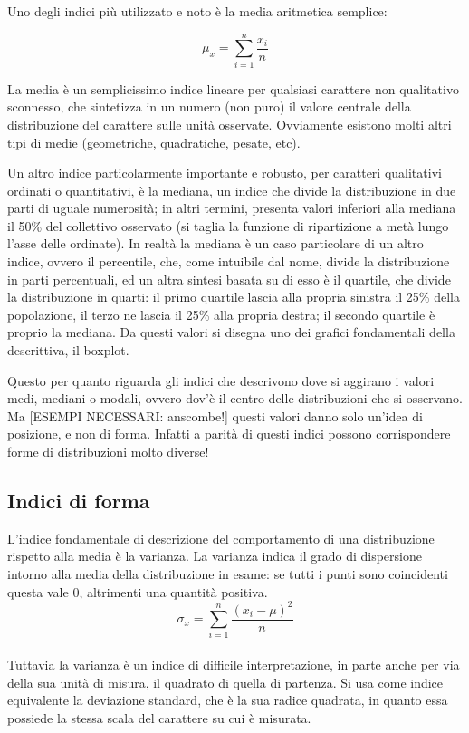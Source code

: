 \documentclass[a4paper]{article}
\begin{document}
Uno degli indici più utilizzato e noto \`{e} la media aritmetica semplice:

\[
  \mu_x=\sum_{i=1}^n\frac{x_i}{n}
\]

La media \`{e} un semplicissimo indice lineare per qualsiasi carattere non qualitativo sconnesso, che sintetizza in un numero (non puro) il valore centrale della distribuzione del carattere sulle unit\`{a} osservate. Ovviamente esistono molti altri tipi di medie (geometriche, quadratiche, pesate, etc).

Un altro indice particolarmente importante e robusto, per caratteri qualitativi ordinati o quantitativi, \`{e} la mediana, un indice che divide la distribuzione in due parti di uguale numerosit\`{a}; in altri termini, presenta valori inferiori alla mediana il 50\% del collettivo osservato (si taglia la funzione di ripartizione a met\`{a} lungo l'asse delle ordinate).
In realt\`{a} la mediana \`{e} un caso particolare di un altro indice, ovvero il percentile, che, come intuibile dal nome, divide la distribuzione in parti percentuali, ed un altra sintesi basata su di esso \`{e} il quartile, che divide la distribuzione in quarti: il primo quartile lascia alla propria sinistra il 25\% della popolazione, il terzo ne lascia il 25\% alla propria destra; il secondo quartile \`{e} proprio la mediana.
Da questi valori si disegna uno dei grafici fondamentali della descrittiva, il boxplot.



Questo per quanto riguarda gli indici che descrivono dove si aggirano i valori medi, mediani o modali, ovvero dov'\`{e} il centro delle distribuzioni che si osservano. Ma [ESEMPI NECESSARI: anscombe!] questi valori danno solo un'idea di posizione, e non di forma. Infatti a parit\`{a} di questi indici possono corrispondere forme di distribuzioni molto diverse!




\subsection{Indici di forma}

L'indice fondamentale di descrizione del comportamento di una distribuzione rispetto alla media \`{e} la varianza.
La varianza indica il grado di dispersione intorno alla media della distribuzione in esame: se tutti i punti sono coincidenti questa vale 0, altrimenti una quantit\`{a} positiva.
\\
\[
 \sigma_x=\sum_{i=1}^n \frac{(x_i - \mu)^2}{n}
\]
\\
Tuttavia la varianza \`{e} un indice di difficile interpretazione, in parte anche per via della sua unit\`{a} di misura, il quadrato di quella di partenza. Si usa come indice equivalente la deviazione standard, che \`{e} la sua radice quadrata, in quanto essa possiede la stessa scala del carattere su cui \`{e} misurata.
\end{document}
